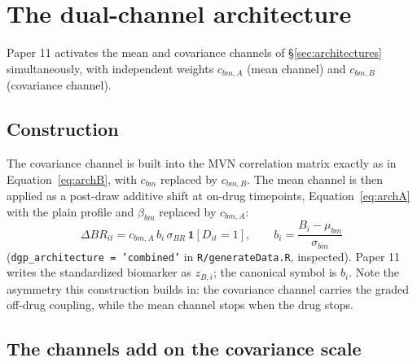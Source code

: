 \documentclass[11pt]{article}
\newcommand{\code}[1]{\texttt{#1}}
\begin{document}
\section{The dual-channel architecture}
\label{sec:dualchannel}

Paper 11 activates the mean and covariance channels of
\S\ref{sec:architectures} simultaneously, with independent weights
$c_{bm,A}$ (mean channel) and $c_{bm,B}$ (covariance channel).

\subsection{Construction}

The covariance channel is built into the MVN correlation matrix
exactly as in Equation~\eqref{eq:archB}, with $c_{bm}$ replaced by
$c_{bm,B}$. The mean channel is then applied as a post-draw additive
shift at on-drug timepoints, Equation~\eqref{eq:archA} with the plain
profile and $\beta_{bm}$ replaced by $c_{bm,A}$:
\begin{equation}
\Delta BR_{it} = c_{bm,A}\, b_i\, \sigma_{BR}\,
  \mathbf{1}[D_{it} = 1], \qquad b_i =
  \frac{B_i - \mu_{bm}}{\sigma_{bm}}
\label{eq:dualchannel-shift}
\end{equation}
(\code{dgp\_architecture = 'combined'} in \code{R/generateData.R},
inspected). Paper 11 writes the standardized biomarker as $z_{B,i}$;
the canonical symbol is $b_i$. Note the asymmetry this construction
builds in: the covariance channel carries the graded off-drug coupling,
while the mean channel stops when the drug stops.

\subsection{The channels add on the covariance scale}
\end{document}
